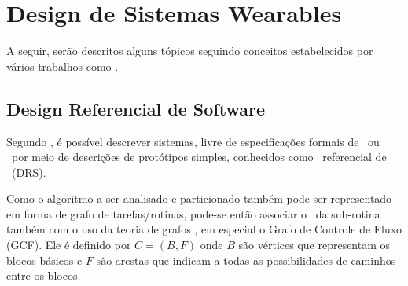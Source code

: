 \section{Design de Sistemas Wearables} \label{chap:design}

   A seguir, serão descritos alguns tópicos seguindo conceitos estabelecidos por vários trabalhos como \cite{Arato2003, Arato2005, Mann2007, Hassine2017, Sass2010}.


   \subsection{Design Referencial de Software} \label{sec:GCF}

      Segundo \cite{Sass2010}, é possível descrever sistemas, livre de especificações formais de \software\ ou \hardware\ por meio de descrições de protótipos simples, conhecidos como \design\ referencial de \software\ (DRS).

      Como o algoritmo a ser analisado e particionado também pode ser representado em forma de grafo de tarefas/rotinas, pode-se então associar o \design\ da sub-rotina também com o uso da teoria de grafos \cite{Mann2007}, em especial o Grafo de Controle de Fluxo (GCF).
      Ele é definido por $C = (B, F) \label{eq:subrotina}$
      onde $B$ são vértices que representam os blocos básicos %
      e $ F $ são arestas que indicam a todas as possibilidades de caminhos entre os blocos.

